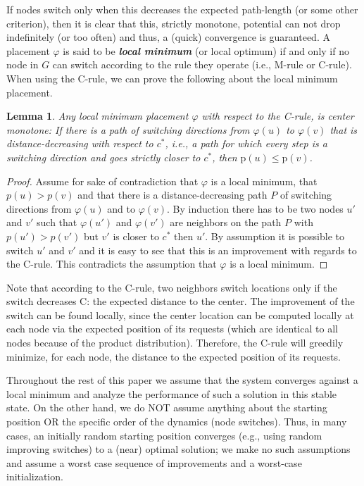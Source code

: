\documentclass[conference]{IEEEtran}
\def\p{\mathrm{p}}
\newtheorem{lemma}{Lemma}
\begin{document}
If nodes switch only when this decreases the expected path-length (or some other criterion), then it is clear that this, strictly monotone, potential can not drop indefinitely (or too often) and thus, a (quick) convergence is guaranteed.
A placement $\varphi$ is said to be {\bf \emph{local minimum}} (or local optimum) if and only if no node in $G$ can switch according to the rule they operate (i.e., M-rule or C-rule). When using the C-rule, we can prove the following about the local minimum placement.

\begin{lemma}\label{lem:monoton}
Any local minimum placement $\varphi$ with respect to the C-rule, is \emph{center monotone}: If there is a path of switching directions from $\varphi(u)$ to $\varphi(v)$ that is distance-decreasing with respect to $c^*$, i.e., a path for which every step is a switching direction and goes strictly closer to $c^*$, then $\p(u) \leq \p(v)$.
\end{lemma}
\begin{proof}
Assume for sake of contradiction that $\varphi$ is a local minimum, that $p(u) > p(v)$ and that there is a distance-decreasing path $P$ of switching directions from $\varphi(u)$ and to $\varphi(v)$. By induction there has to be two nodes $u'$ and $v'$ such that $\varphi(u')$ and $\varphi(v')$ are neighbors on the path $P$ with $p(u') > p(v')$ but $v'$ is closer to $c^*$ then $u'$. By assumption it is possible to switch $u'$ and $v'$ and it is easy to see that this is an improvement with regards to the C-rule. This contradicts the assumption that $\varphi$ is a local minimum. 
\end{proof}

Note that according to the C-rule, two neighbors switch locations only if the switch decreases C: the expected distance to the center.
The improvement of the switch can be found  locally, since the center location can be computed locally at each node via the  expected position of its requests (which are identical to all nodes because of the product distribution). Therefore, the C-rule will greedily minimize, for each node, the distance to the expected position of its requests. 



Throughout the rest of this paper we assume that the system converges against a local minimum and analyze the performance of such a solution in this stable state. On the other hand, we do NOT assume anything about the starting position OR the specific order of the dynamics (node switches). Thus, in many cases, an initially random starting position converges (e.g., using random improving switches) to a (near) optimal solution; we make no such assumptions and assume a worst case sequence of improvements and a worst-case initialization.
\end{document}
